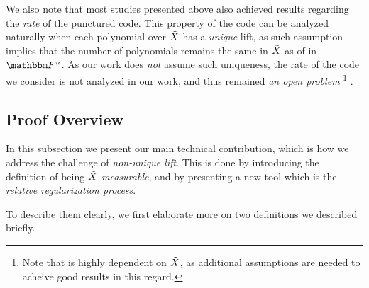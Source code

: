 %
We also note that most studies presented above also achieved results regarding the \emph{rate} of the punctured code.
This property of the code can be analyzed naturally when each polynomial over ${\tilde{X}}$ has a \emph{unique} lift, as such assumption implies that the number of polynomials remains the same in ${\tilde{X}}$ as of in $\field$.
As our work does \emph{not} assume such uniqueness, the rate of the code we consider is not analyzed in our work, and thus remained \emph{an open problem}
\footnote{Note that is highly dependent on ${\tilde{X}}$, as additional assumptions are needed to acheive good results in this regard.}
.

\subsection{Proof Overview}\label{subsec:our-work}
In this subsection we present our main technical contribution, which is how we address the challenge of \emph{non-unique lift}.
This is done by introducing the definition of being \emph{${\tilde{X}}$-measurable}, and by presenting a new tool which is the \emph{relative regularization process}.

To describe them clearly, we first elaborate more on two definitions we described briefly.
